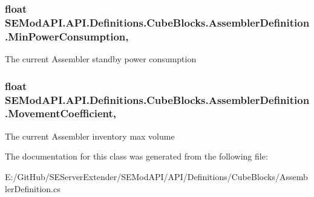 \subsubsection[{Min\+Power\+Consumption}]{\setlength{\rightskip}{0pt plus 5cm}float S\+E\+Mod\+A\+P\+I.\+A\+P\+I.\+Definitions.\+Cube\+Blocks.\+Assembler\+Definition.\+Min\+Power\+Consumption\hspace{0.3cm}{\ttfamily [get]}, {\ttfamily [set]}}\label{class_s_e_mod_a_p_i_1_1_a_p_i_1_1_definitions_1_1_cube_blocks_1_1_assembler_definition_ae02ed07db6df073e81033ec21ad70234}


The current Assembler standby power consumption 

\hypertarget{class_s_e_mod_a_p_i_1_1_a_p_i_1_1_definitions_1_1_cube_blocks_1_1_assembler_definition_a6b65b70de1051432de8f47fcc65d0f6a}{}
\subsubsection[{Movement\+Coefficient}]{\setlength{\rightskip}{0pt plus 5cm}float S\+E\+Mod\+A\+P\+I.\+A\+P\+I.\+Definitions.\+Cube\+Blocks.\+Assembler\+Definition.\+Movement\+Coefficient\hspace{0.3cm}{\ttfamily [get]}, {\ttfamily [set]}}\label{class_s_e_mod_a_p_i_1_1_a_p_i_1_1_definitions_1_1_cube_blocks_1_1_assembler_definition_a6b65b70de1051432de8f47fcc65d0f6a}


The current Assembler inventory max volume 



The documentation for this class was generated from the following file\+:\begin{DoxyCompactItemize}
\item 
E\+:/\+Git\+Hub/\+S\+E\+Server\+Extender/\+S\+E\+Mod\+A\+P\+I/\+A\+P\+I/\+Definitions/\+Cube\+Blocks/Assembler\+Definition.\+cs\end{DoxyCompactItemize}
